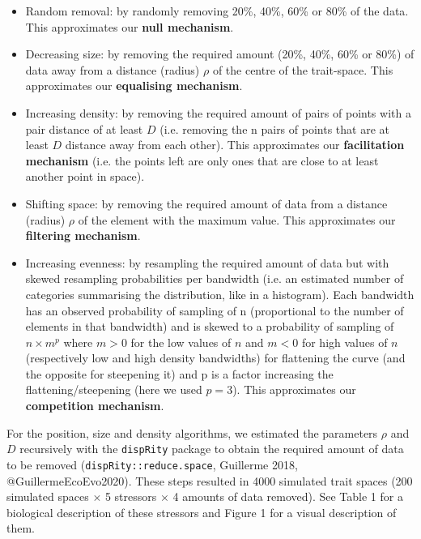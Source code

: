 \documentclass[12pt,letterpaper]{article}
\begin{document}
\begin{itemize}
\item Random removal: by randomly removing 20\%, 40\%, 60\% or 80\% of the data. This approximates our \textbf{null mechanism}.

\item Decreasing size: by removing the required amount (20\%, 40\%, 60\% or 80\%) of data away from a distance (radius)  $\rho$ of the centre of the trait-space.
This approximates our \textbf{equalising mechanism}.

\item Increasing density: by removing the required amount of pairs of points with a pair distance of at least $D$ (i.e. removing the n pairs of points that are at least $D$ distance away from each other).
This approximates our \textbf{facilitation mechanism} (i.e. the points left are only ones that are close to at least another point in space).

\item Shifting space: by removing the required amount of data from a distance (radius) $\rho$ of the element with the maximum value.
This approximates our \textbf{filtering mechanism}.

\item Increasing evenness: by resampling the required amount of data but with skewed resampling probabilities per bandwidth (i.e. an estimated number of categories summarising the distribution, like in a histogram).
Each bandwidth has an observed probability of sampling of n (proportional to the number of elements in that bandwidth) and is skewed to a probability of sampling of $n \times m^{p}$ where $m>0$ for the low values of $n$ and $m<0$ for high values of $n$ (respectively low and high density bandwidths) for flattening the curve (and the opposite for steepening it) and p is a factor increasing the flattening/steepening (here we used $p=3$). This approximates our \textbf{competition mechanism}.
\end{itemize}

For the position, size and density algorithms, we estimated the parameters $\rho$ and $D$ recursively with the \texttt{dispRity} package to obtain the required amount of data to be removed (\texttt{dispRity::reduce.space}, Guillerme 2018, @GuillermeEcoEvo2020).
These steps resulted in 4000 simulated trait spaces (200 simulated spaces $\times$ 5 stressors $\times$ 4 amounts of data removed).
See Table 1 for a biological description of these stressors and Figure 1 for a visual description of them.
\end{document}
